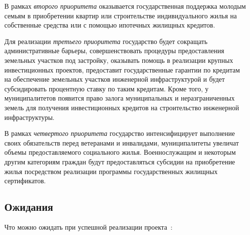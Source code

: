 \documentclass[article, 12pt, russian, oneside]{ncc}
\begin{document}
В рамках \emph{второго приоритета} оказывается государственная
поддержка молодым семьям в приобретении квартир или строительстве
индивидуального жилья на собственные средства или с помощью ипотечных
жилищных кредитов.

Для реализации \emph{третьего приоритета} государство будет сокращать
административные барьеры, совершенствовать процедуры предоставления
земельных участков под застройку, оказывать помощь в реализации
крупных инвестиционных проектов, предоставит государственные гарантии
по кредитам на обеспечение земельных участков инженерной
инфраструктурой и будет субсидировать процентную ставку по таким
кредитам. Кроме того, у муниципалитетов появится право залога
муниципальных и неразграниченных земель для получения инвестиционных
кредитов на строительство инженерной инфраструктуры.

В рамках \emph{четвертого приоритета} государство интенсифицирует
выполнение своих обязательств перед ветеранами и инвалидами,
муниципалитеты увеличат объемы предоставляемого социального
жилья. Военнослужащим и некоторым другим категориям граждан будут
предоставляться субсидии на приобретение жилья посредством реализации
программы государственных жилищных сертификатов.

\subsection{Ожидания}

Что можно ожидать при успешной реализации проекта~\cite{Hub_Waitings}:
\end{document}
